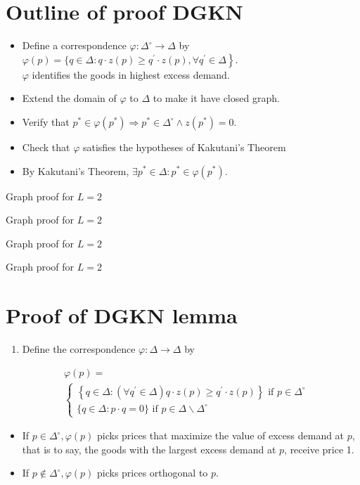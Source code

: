 \documentclass[10pt]{article}
\begin{document}
\section*{Outline of proof DGKN}
\begin{itemize}
  \item Define a correspondence $\varphi: \Delta^{\circ} \rightarrow \Delta$ by $\varphi(p)=\{q \in \Delta: q \cdot z(p) \left.\geq q^{\prime} \cdot z(p), \forall q^{\prime} \in \Delta\right\}$.\\
$\varphi$ identifies the goods in highest excess demand.
  \item Extend the domain of $\varphi$ to $\Delta$ to make it have closed graph.
  \item Verify that $p^{*} \in \varphi\left(p^{*}\right) \Longrightarrow p^{*} \in \Delta^{\circ} \wedge z\left(p^{*}\right)=0$.
  \item Check that $\varphi$ satisfies the hypotheses of Kakutani's Theorem
  \item By Kakutani's Theorem, $\exists p^{*} \in \Delta: p^{*} \in \varphi\left(p^{*}\right)$.
\end{itemize}

Graph proof for $L=2$

Graph proof for $L=2$

Graph proof for $L=2$

Graph proof for $L=2$

\section*{Proof of DGKN lemma}
\begin{enumerate}
  \item Define the correspondence $\varphi: \Delta \rightarrow \Delta$ by
\end{enumerate}

$$
\begin{aligned}
& \varphi(p)= \\
& \left\{\begin{array}{l}
\left\{q \in \Delta:\left(\forall q^{\prime} \in \Delta\right) q \cdot z(p) \geq q^{\prime} \cdot z(p)\right\} \text { if } p \in \Delta^{\circ} \\
\{q \in \Delta: p \cdot q=0\} \text { if } p \in \Delta \backslash \Delta^{\circ}
\end{array}\right.
\end{aligned}
$$

\begin{itemize}
  \item If $p \in \Delta^{\circ}, \varphi(p)$ picks prices that maximize the value of excess demand at $p$, that is to say, the goods with the largest excess demand at $p$, receive price 1.
  \item If $p \notin \Delta^{\circ}, \varphi(p)$ picks prices orthogonal to $p$.
\end{itemize}
\end{document}
